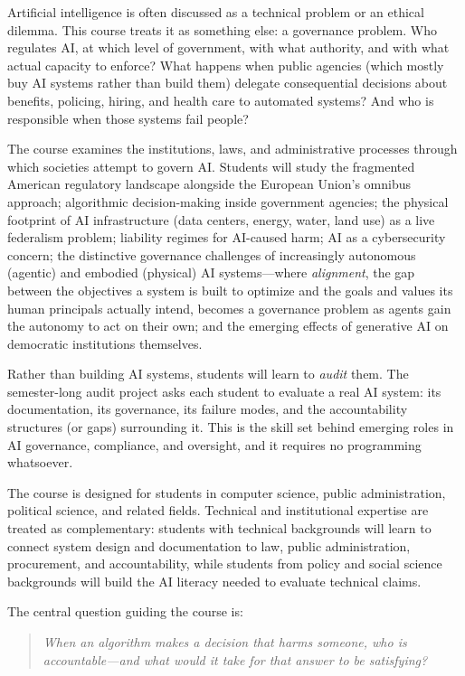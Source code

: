 \documentclass[12pt]{article}
\begin{document}
{\setlength{\parindent}{0pt}\setlength{\parskip}{0.6\baselineskip}%
Artificial intelligence is often discussed as a technical problem or an ethical dilemma. This course treats it as something else: a governance problem. Who regulates AI, at which level of government, with what authority, and with what actual capacity to enforce? What happens when public agencies (which mostly buy AI systems rather than build them) delegate consequential decisions about benefits, policing, hiring, and health care to automated systems? And who is responsible when those systems fail people?

The course examines the institutions, laws, and administrative processes through which societies attempt to govern AI. Students will study the fragmented American regulatory landscape alongside the European Union's omnibus approach; algorithmic decision-making inside government agencies; the physical footprint of AI infrastructure (data centers, energy, water, land use) as a live federalism problem; liability regimes for AI-caused harm; AI as a cybersecurity concern; the distinctive governance challenges of increasingly autonomous (agentic) and embodied (physical) AI systems---where \emph{alignment}, the gap between the objectives a system is built to optimize and the goals and values its human principals actually intend, becomes a governance problem as agents gain the autonomy to act on their own; and the emerging effects of generative AI on democratic institutions themselves.

Rather than building AI systems, students will learn to \emph{audit} them. The semester-long audit project asks each student to evaluate a real AI system: its documentation, its governance, its failure modes, and the accountability structures (or gaps) surrounding it. This is the skill set behind emerging roles in AI governance, compliance, and oversight, and it requires no programming whatsoever.

The course is designed for students in computer science, public administration, political science, and related fields. Technical and institutional expertise are treated as complementary: students with technical backgrounds will learn to connect system design and documentation to law, public administration, procurement, and accountability, while students from policy and social science backgrounds will build the AI literacy needed to evaluate technical claims.

The central question guiding the course is:

\begin{quote}
\textit{When an algorithm makes a decision that harms someone, who is accountable---and what would it take for that answer to be satisfying?}
\end{quote}
}
\end{document}
